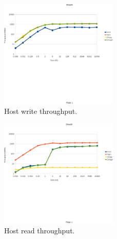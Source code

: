 \begin{figure}[t]
\centering
\includegraphics[width=0.5\textwidth, trim=0.0in 2.75in -0.1in 0.60in,
 clip=true]{eps/write_tput.eps}
\caption{Host write throughput.}
\label{fig:write_tput}
\end{figure}
\begin{figure}[t]
 \centering
 \includegraphics[width=0.5\textwidth, trim=0.0in 2.5in -0.1in 0.6in,
 clip=true]{eps/read_tput.eps}
 \vspace{-2em}
 \caption{Host read throughput.}
\label{fig:read_tput}
\end{figure}
